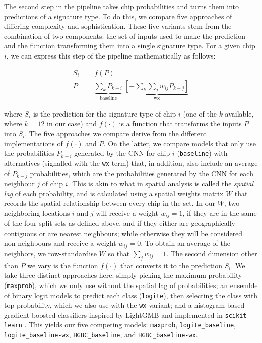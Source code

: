 The second step in the pipeline takes chip probabilities and turns them into
predictions of a signature type. To do this, we compare five approaches of
differing complexity and sophistication. These five variants stem from the
combination of two components: the set of inputs used to make the prediction and
the function transforming them into a single signature type. For a given chip
$i$, we can express this step of the pipeline mathematically as follows:

\begin{equation}
\begin{split}
        S_i & = f(P) \\
        P & = \underbrace{
                \sum_{k} P_{k-i}
        }_\text{baseline}\;
        \underbrace{
        \left[+ \sum_{k} \sum_j w_{ij} P_{k-j}\right]
}_\text{wx}
        \label{eq:sp_model}
\end{split}
\end{equation}

where $S_i$ is the prediction for the signature type of chip $i$ (one of the $k$ available, where
$k=12$ in our case) and $f(\cdot)$ is a function that
transforms the inputs $P$ into $S_i$. The five
approaches we compare derive from the different implementations of $f(\cdot)$
and $P$. On the latter, we compare models that only use the probabilities
$P_{k-i}$ generated by the CNN for chip $i$ (\texttt{baseline}) with alternatives
(signalled with the \texttt{wx} term) that, in addition,
also include an average of $P_{k-j}$ probabilities, which are the
probabilities generated by the CNN for each neighbour $j$ of chip $i$. This is
akin to what in spatial analysis is called the \textit{spatial lag} of each
probability, and is calculated using a spatial weights matrix $W$ that records
the spatial relationship between every chip in the set. In our $W$, two
neighboring locations $i$ and $j$ will receive a weight $w_{ij}=1$,
if they are in the same of the four split sets as defined above, and if they
either are geographically contiguous or are nearest neighbours; while otherwise
they will be considered non-neighbours and receive a weight $w_{ij}=0$. To obtain
an average of the neighbors, we row-standardise $W$ so that $\sum_j w_{ij} =
1$. The second dimension other than $P$ we vary is the function $f(\cdot)$ that converts
it to the prediction $S_i$. We take three distinct approaches here: simply
picking the maximum probability (\texttt{maxprob}), which we only use without the spatial lag of
probabilities; an ensemble of binary logit models to predict each class
(\texttt{logite}), then selecting the class with top probability, which we
also use with the \texttt{wx} variant; and a histogram-based gradient boosted
classifiers inspired by LightGMB \citep{ke2017lightgbm} and implemented in
\texttt{scikit-learn} \citep{pedregosa2011scikit}. This yields our five
competing models:
\texttt{maxprob}, \texttt{logite\_baseline}, \texttt{logite\_baseline-wx},
\texttt{HGBC\_baseline}, and \texttt{HGBC\_baseline-wx}.

